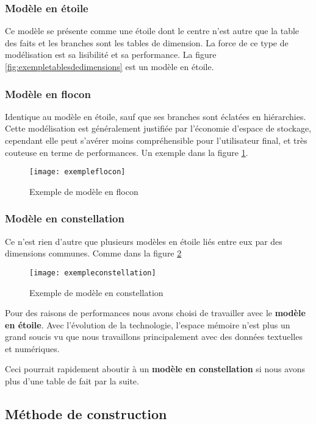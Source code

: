 \subsubsection{Modèle en étoile}
Ce modèle se présente comme une étoile dont le centre n’est autre que la table des faits et les branches sont les tables de dimension. La force de ce type de modélisation est sa lisibilité et sa performance. La figure \ref{fig:exempletablesdedimensions} est un modèle en étoile.

\subsubsection{Modèle en flocon}
Identique au modèle en étoile, sauf que ses branches sont éclatées en hiérarchies. Cette modélisation est généralement justifiée par l’économie d’espace de stockage, cependant elle peut s’avérer moins compréhensible pour l’utilisateur final, et très couteuse en terme de performances. Un exemple dans la figure \ref{fig:exempleflocon}.
\begin{figure}[H]
    \centering
    \texttt{[image: exempleflocon]}
    \caption{Exemple de modèle en flocon}
    \label{fig:exempleflocon}
\end{figure}

\subsubsection{Modèle en constellation}
Ce n’est rien d’autre que plusieurs modèles en étoile liés entre eux par des dimensions communes. Comme dans la figure \ref{fig:exempleconstellation}
\begin{figure}[H]
    \centering
    \texttt{[image: exempleconstellation]}
    \caption{Exemple de modèle en constellation}
    \label{fig:exempleconstellation}
\end{figure}

Pour des raisons de performances nous avons choisi de travailler avec le \textbf{modèle en étoile}. Avec l'évolution de la technologie, l'espace mémoire n'est plus un grand soucis vu que nous travaillons principalement avec des données textuelles et numériques.

Ceci pourrait rapidement aboutir à un \textbf{modèle en constellation} si nous avons plus d'une table de fait par la suite.

\subsection{Méthode de construction}
\blindtext

